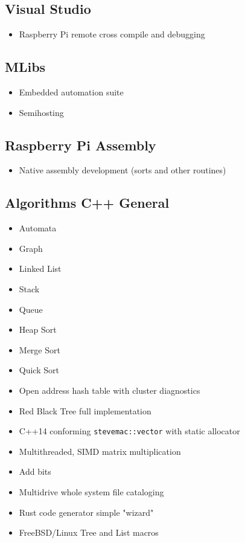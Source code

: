 \documentclass{article}
\begin{document}
\subsection*{Visual Studio}
\begin{itemize}
    \item Raspberry Pi remote cross compile and debugging
\end{itemize}

\subsection*{MLibs}
\begin{itemize}
    \item Embedded automation suite
    \item Semihosting
\end{itemize}

\subsection*{Raspberry Pi Assembly}
\begin{itemize}
    \item Native assembly development (sorts and other routines)
\end{itemize}

\subsection*{Algorithms C++ General}
\begin{itemize}
    \item Automata
    \item Graph
    \item Linked List
    \item Stack
    \item Queue
    \item Heap Sort
    \item Merge Sort
    \item Quick Sort
    \item Open address hash table with cluster diagnostics
    \item Red Black Tree full implementation
    \item C++14 conforming \texttt{stevemac::vector} with static allocator
    \item Multithreaded, SIMD matrix multiplication
    \item Add bits
    \item Multidrive whole system file cataloging
    \item Rust code generator simple "wizard"
    \item FreeBSD/Linux Tree and List macros
\end{itemize}
\end{document}
